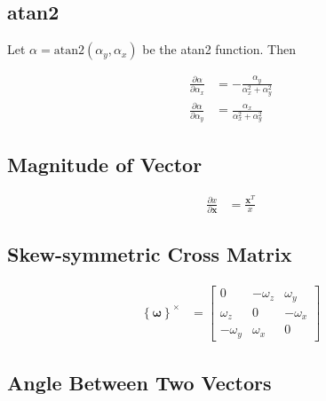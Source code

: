 \documentclass[]{article}
\newcommand{\vb}[1]{\bm{#1}} %
\newcommand{\pd}[2]{\frac{\partial #1}{\partial #2}} %
\begin{document}
\subsection{atan2}
\label{sec:atan2}

Let $\alpha = \mathrm{atan2} \left( \alpha_y, \alpha_x \right)$ be the atan2 function. Then

\begin{align}
	\label{eq:datan2dx}
	\pd{\alpha}{\alpha_x} &= - \frac{\alpha_y}{\alpha_x^2 + \alpha_y^2} \\
	\label{eq:datan2dy}
	\pd{\alpha}{\alpha_y} &= \frac{\alpha_x}{\alpha_x^2 + \alpha_y^2}
\end{align}

\subsection{Magnitude of Vector}

\begin{align}
	\pd{x}{\vb{x}} &= \frac{\vb{x}^T}{x}
\end{align}

\subsection{Skew-symmetric Cross Matrix}

\begin{align}
	\label{eq:omega_cross}
	\left\{\vb{\omega} \right\}^{\times} &= \left[ \begin{array}{ccc}
	0 & -\omega_z & \omega_y \\
	\omega_z & 0 & -\omega_x \\
	-\omega_y & \omega_x & 0
	\end{array} \right]
\end{align}

\subsection{Angle Between Two Vectors}
\label{sec:angle_between_2_vectors}
\end{document}
